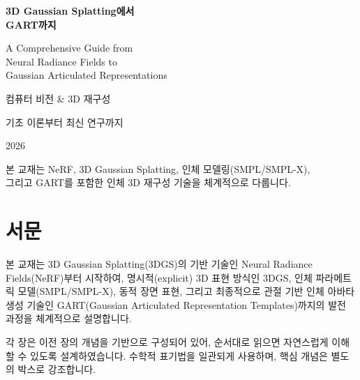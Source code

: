 \documentclass[11pt, a4paper]{report}
\begin{document}
\begin{titlepage}
\centering
\vspace*{2cm}

{\Huge\bfseries\color{defblue} 3D Gaussian Splatting에서\\[0.3cm] GART까지}

\vspace{1cm}

{\LARGE\color{defblue!70!black} A Comprehensive Guide from\\Neural Radiance Fields to\\Gaussian Articulated Representations}

\vspace{2cm}

{\large 컴퓨터 비전 \& 3D 재구성}

\vspace{0.5cm}

{\large 기초 이론부터 최신 연구까지}

\vspace{3cm}

{\large 2026}

\vspace{\fill}

{\small\color{gray} 본 교재는 NeRF, 3D Gaussian Splatting, 인체 모델링(SMPL/SMPL-X),\\
그리고 GART를 포함한 인체 3D 재구성 기술을 체계적으로 다룹니다.}
\end{titlepage}

\tableofcontents
\newpage

\chapter*{서문}

본 교재는 3D Gaussian Splatting(3DGS)의 기반 기술인 Neural Radiance Fields(NeRF)부터 시작하여, 명시적(explicit) 3D 표현 방식인 3DGS, 인체 파라메트릭 모델(SMPL/SMPL-X), 동적 장면 표현, 그리고 최종적으로 관절 기반 인체 아바타 생성 기술인 GART(Gaussian Articulated Representation Templates)까지의 발전 과정을 체계적으로 설명합니다.

각 장은 이전 장의 개념을 기반으로 구성되어 있어, 순서대로 읽으면 자연스럽게 이해할 수 있도록 설계하였습니다. 수학적 표기법을 일관되게 사용하며, 핵심 개념은 별도의 박스로 강조합니다.
\end{document}
